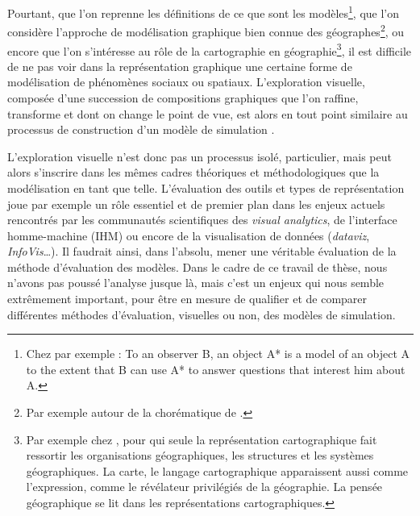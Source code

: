 \noindent Pourtant, que l'on reprenne les définitions de ce que sont les modèles\footnote{
	Chez \textcite{minsky_matter_1965} par exemple : \og To an observer B, an object A* is a model of an object A to the extent that B can use A* to answer questions that interest him about A.\fg{}
}, que l'on considère l'approche de modélisation graphique bien connue des géographes\footnote{
	Par exemple autour de la chorématique de \textcite{brunet1980composition}.
}, ou encore que l'on s'intéresse au rôle de la cartographie en géographie\footnote{
	Par exemple chez \textcite[246--247]{pinchemel_geographie_1979}, pour qui \og seule la représentation cartographique fait ressortir les organisations géographiques, les structures et les systèmes géographiques.
	La carte, le langage cartographique apparaissent aussi comme l'expression, comme le révélateur privilégiés de la géographie.
	La pensée géographique se lit dans les représentations cartographiques\fg{}.
}, il est difficile de ne pas voir dans la représentation graphique une certaine forme de modélisation de phénomènes sociaux ou spatiaux.
L'exploration visuelle, composée d'une succession de compositions graphiques que l'on raffine, transforme et dont on change le point de vue, est alors en tout point similaire au processus de construction d'un modèle de simulation \autocite{andrienko2018viewing}.

\noindent L'exploration visuelle n'est donc pas un processus isolé, particulier, mais peut alors s'inscrire dans les mêmes cadres théoriques et méthodologiques que la modélisation en tant que telle.
L'évaluation des outils et types de représentation joue par exemple un rôle essentiel et de premier plan dans les enjeux actuels rencontrés par les communautés scientifiques des \textit{visual analytics}, de l'interface homme-machine (IHM) ou encore de la visualisation de données (\textit{dataviz}, \textit{InfoVis}\ldots).
Il faudrait ainsi, dans l'absolu, mener une véritable évaluation de la méthode d'évaluation des modèles.
Dans le cadre de ce travail de thèse, nous n'avons pas poussé l'analyse jusque là, mais c'est un enjeux qui nous semble extrêmement important, pour être en mesure de qualifier et de comparer différentes méthodes d'évaluation, visuelles ou non, des modèles de simulation.

